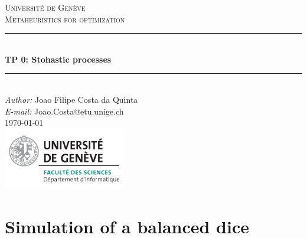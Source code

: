 \documentclass[a4paper]{article}
\makeatletter
\newcommand\TPid{0}
\newcommand\TPname{Stohastic processes}
\newcommand\Firstname{Joao Filipe}
\newcommand\Familyname{Costa da Quinta}
\newcommand\Email{Joao.Costa@etu.unige.ch}
\makeatother
\begin{document}
\begin{titlepage}

\newcommand{\HRule}{\rule{\linewidth}{0.5mm}} 							%

\center 
 
\textsc{\LARGE Université de Genève}\\[1cm]

\textsc{\Large Metaheuristics for optimization}\\[0.2cm]									%
\HRule \\[0.8cm]
{ \huge \bfseries TP \TPid : \TPname}\\[0.7cm]								%
\HRule \\[2cm]
\large
\emph{Author:} \Firstname \; \Familyname\\[0.5cm]		
\emph{E-mail:} {\color{blue}\Email}\\[7cm]		
{\large \today}\\[2cm]
\includegraphics[width=0.4\textwidth]{images/unige_csd.png}\\[1cm] 	%
\vfill 
\end{titlepage}


\section*{Simulation of a balanced dice}
\end{document}
